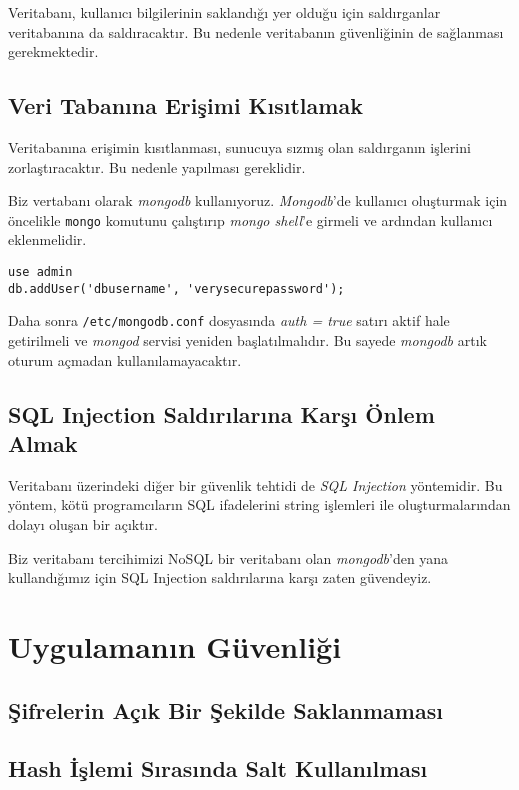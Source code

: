 \documentclass[11pt]{report}
\begin{document}
Veritabanı, kullanıcı bilgilerinin saklandığı yer olduğu için saldırganlar veritabanına da saldıracaktır. Bu nedenle veritabanın güvenliğinin de sağlanması gerekmektedir.

\subsection{Veri Tabanına Erişimi Kısıtlamak}

Veritabanına erişimin kısıtlanması, sunucuya sızmış olan saldırganın işlerini zorlaştıracaktır. Bu nedenle yapılması gereklidir.

Biz vertabanı olarak \emph{mongodb} kullanıyoruz. \emph{Mongodb}'de kullanıcı oluşturmak için öncelikle \texttt{mongo} komutunu çalıştırıp \emph{mongo shell}'e girmeli ve ardından kullanıcı eklenmelidir.

\begin{lstlisting}[caption=MongoDB Kullanıcı Ekleme]
use admin
db.addUser('dbusername', 'verysecurepassword');
\end{lstlisting}

Daha sonra \texttt{/etc/mongodb.conf} dosyasında \emph{auth = true} satırı aktif hale getirilmeli ve \emph{mongod} servisi yeniden başlatılmalıdır. Bu sayede \emph{mongodb} artık oturum açmadan kullanılamayacaktır.

\subsection{SQL Injection Saldırılarına Karşı Önlem Almak}

Veritabanı üzerindeki diğer bir güvenlik tehtidi de \emph{SQL Injection} yöntemidir. Bu yöntem, kötü programcıların SQL ifadelerini string işlemleri ile oluşturmalarından dolayı oluşan bir açıktır.

Biz veritabanı tercihimizi NoSQL bir veritabanı olan \emph{mongodb}'den yana kullandığımız için SQL Injection saldırılarına karşı zaten güvendeyiz.

\section{Uygulamanın Güvenliği}
\subsection{Şifrelerin Açık Bir Şekilde Saklanmaması}
\subsection{Hash İşlemi Sırasında Salt Kullanılması}
\end{document}
